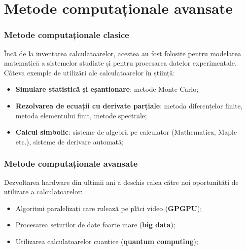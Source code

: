 \section{Metode computaționale avansate}

\begin{frame}
\frametitle{Metode computaționale clasice}

Încă de la inventarea calculatoarelor, acestea au fost folosite pentru modelarea matematică a sistemelor studiate și pentru procesarea datelor experimentale. \\[1em]

Câteva exemple de utilizări ale calculatoarelor în știință:
\begin{itemize}
    \item \textbf{Simulare statistică și eșantionare}: metode Monte Carlo;
    \item \textbf{Rezolvarea de ecuații cu derivate parțiale}: metoda diferențelor finite, metoda elementului finit, metode spectrale;
    \item \textbf{Calcul simbolic}: sisteme de algebră pe calculator (Mathematica, Maple etc.), sisteme de derivare automată;
\end{itemize}
\end{frame}

\begin{frame}
\frametitle{Metode computaționale avansate}

Dezvoltarea hardware din ultimii ani a deschis calea către noi oportunități de utilizare a calculatoarelor:
\begin{itemize}
    \item Algoritmi paralelizați care rulează pe plăci video (\textbf{GPGPU});
    \item Procesarea seturilor de date foarte mare (\textbf{big data});
    \item Utilizarea calculatoarelor cuantice (\textbf{quantum computing});
\end{itemize}

\begin{figure}[hbp]
    \centering
\end{figure}
\end{frame}

